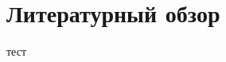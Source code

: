 \section{Литературный обзор}
тест~\cite{De_La_Cochetiere_2008, Lofmark_2006, Tanaka_2009}

\newpage

